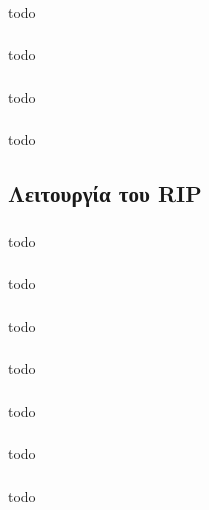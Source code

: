 \documentclass[a4paper, 12pt]{article}
\begin{document}
		\subsubsection{}
			todo

		\subsubsection{}
			todo

		\subsubsection{}
			todo

		\subsubsection{}
			todo

	\subsection{Λειτουργία του RIP}

		\subsubsection{}
			todo

		\subsubsection{}
			todo

		\subsubsection{}
			todo

		\subsubsection{}
			todo

		\subsubsection{}
			todo

		\subsubsection{}
			todo

		\subsubsection{}
			todo
\end{document}
